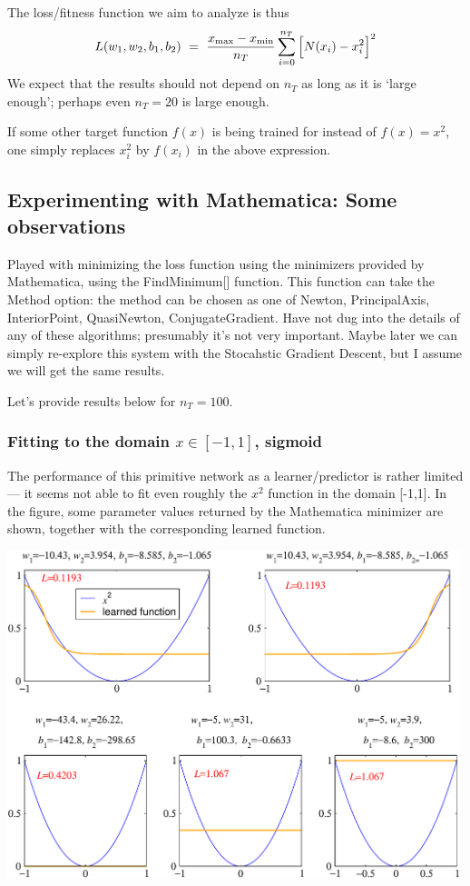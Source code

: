 \documentclass[12pt,a4paper]{article}
\begin{document}
The loss/fitness function we aim to analyze is thus 
\begin{equation}
L(w_1,w_2,b_1,b_2) ~=~  \frac{x_{\rm max} - x_{\rm min}}{n_T} \sum_{i=0}^{n_T} \Big[ N(x_i) -x_i^2 \Big]^2 
\end{equation}
%
We expect that the results should not depend on $n_T$ as long as it is `large enough'; perhaps
even $n_T=20$ is large enough. 

If some other target function $f(x)$ is being trained for instead of $f(x)=x^2$, one simply replaces
$x_i^2$ by $f(x_i)$ in the above expression.  


\subsection{Experimenting with Mathematica: Some observations}

Played with minimizing the loss function using the minimizers provided by Mathematica, using the 
FindMinimum[] function.  This function can take the Method option: the method can be chosen as one
of Newton, PrincipalAxis, InteriorPoint, QuasiNewton, ConjugateGradient.  Have not dug into the
details of any of these algorithms; presumably it's not very important.  Maybe later we can simply
re-explore this system with the Stocahstic Gradient Descent, but I assume we will get the same
results.  

Let's provide results below for $n_T=100$.  


\subsubsection{Fitting to the domain $x\in[-1,1]$, sigmoid}

The performance of this primitive network as a learner/predictor is rather limited --- it seems not
able to fit even roughly the $x^2$ function in the domain [-1,1].  In the figure, some parameter
values returned by the Mathematica minimizer are shown, together with the corresponding learned function.



\smallskip

\begin{center}
\includegraphics[width=0.99\textwidth]{Images/3node_largedomain_learnedfunctions_a_01}
\end{center}
\end{document}

